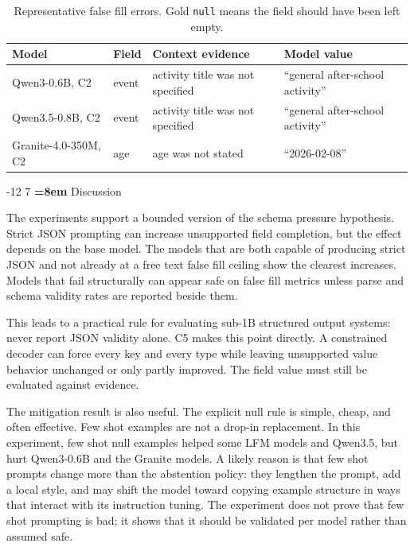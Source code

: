\documentclass{svproc}
\makeatletter
\newcommand{\cnull}{\texttt{null}\xspace}
\renewcommand\section{\@startsection{section}{1}{\z@}%
   {-12\p@ \@plus -4\p@ \@minus -4\p@}%
   {7\p@ \@plus 4\p@ \@minus 4\p@}%
   {\normalfont\large\bfseries\boldmath
    \rightskip=\z@ \@plus 8em\pretolerance=10000 }}
\makeatother
\begin{document}
\begin{table}[t]
\centering
\caption{Representative false fill errors. Gold \cnull means the field should have been left empty.}
\label{tab:qual}
\small
\renewcommand{\arraystretch}{0.95}
\begin{tabularx}{\textwidth}{@{}l l X l@{}}
\toprule
Model & Field & Context evidence & Model value \\
\midrule
Qwen3-0.6B, C2 & event & activity title was not specified & ``general after-school activity'' \\
Qwen3.5-0.8B, C2 & event & activity title was not specified & ``general after-school activity'' \\
Granite-4.0-350M, C2 & age & age was not stated & ``2026-02-08'' \\
\bottomrule
\end{tabularx}
\end{table}

\section{Discussion}

The experiments support a bounded version of the schema pressure hypothesis. Strict JSON prompting can increase unsupported field completion, but the effect depends on the base model. The models that are both capable of producing strict JSON and not already at a free text false fill ceiling show the clearest increases. Models that fail structurally can appear safe on false fill metrics unless parse and schema validity rates are reported beside them.

This leads to a practical rule for evaluating sub-1B structured output systems: never report JSON validity alone. C5 makes this point directly. A constrained decoder can force every key and every type while leaving unsupported value behavior unchanged or only partly improved. The field value must still be evaluated against evidence.

The mitigation result is also useful. The explicit null rule is simple, cheap, and often effective. Few shot examples are not a drop-in replacement. In this experiment, few shot null examples helped some LFM models and Qwen3.5, but hurt Qwen3-0.6B and the Granite models. A likely reason is that few shot prompts change more than the abstention policy: they lengthen the prompt, add a local style, and may shift the model toward copying example structure in ways that interact with its instruction tuning. The experiment does not prove that few shot prompting is bad; it shows that it should be validated per model rather than assumed safe.
\end{document}
